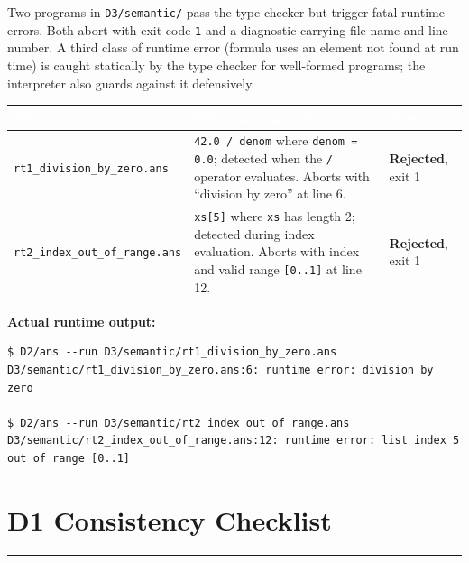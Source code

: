 \documentclass[11pt,a4paper]{article}
\newcommand{\code}[1]{\texttt{#1}}
\newcommand{\file}[1]{{\footnotesize\texttt{#1}}}
\newcommand{\statuserr}{\textcolor{ansdanger}{\textbf{Rejected}}}
\newcommand{\sectionrule}{\vspace{-3pt}\textcolor{ansborder}{\rule{\textwidth}{0.6pt}}\vspace{2pt}}
\begin{document}
Two programs in \code{D3/semantic/} pass the type checker but trigger fatal
runtime errors. Both abort with exit code \code{1} and a diagnostic carrying
file name and line number. A third class of runtime error (formula uses an
element not found at run time) is caught statically by the type checker for
well-formed programs; the interpreter also guards against it defensively.

\begin{table}[h]
\vspace{2pt}
\centering\small
{}
\begin{tabularx}{\textwidth}{@{} Y Y L{1.5cm} @{}}
\toprule
{}
\textcolor{white}{\textbf{File}} &
\textcolor{white}{\textbf{Defect \& diagnostic}} &
\textcolor{white}{\textbf{Result}} \\
\midrule
\file{rt1\_division\_by\_zero.ans} &
\code{42.0 / denom} where \code{denom = 0.0}; detected when the
\code{/} operator evaluates. Aborts with ``division by zero'' at line 6. &
\statuserr, exit 1 \\
\file{rt2\_index\_out\_of\_range.ans} &
\code{xs[5]} where \code{xs} has length 2; detected during index evaluation.
Aborts with index and valid range \code{[0..1]} at line 12. &
\statuserr, exit 1 \\
\bottomrule
\end{tabularx}
\end{table}

\textbf{Actual runtime output:}
\begin{lstlisting}[style=terminal]
$ D2/ans --run D3/semantic/rt1_division_by_zero.ans
D3/semantic/rt1_division_by_zero.ans:6: runtime error: division by zero

$ D2/ans --run D3/semantic/rt2_index_out_of_range.ans
D3/semantic/rt2_index_out_of_range.ans:12: runtime error: list index 5 out of range [0..1]
\end{lstlisting}

\section{D1 Consistency Checklist}
\sectionrule
\end{document}
